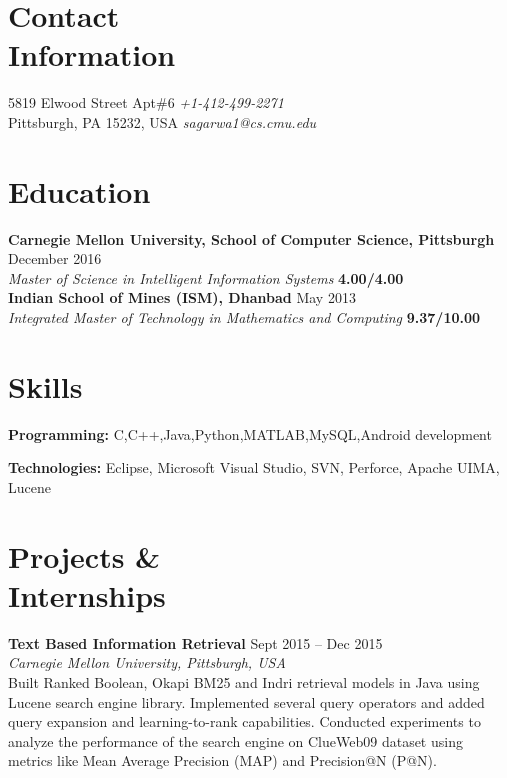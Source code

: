 \documentclass[margin,line]{resume}
\begin{document}
\begin{resume}

\section{\mysidestyle Contact \\Information}
		5819 Elwood Street Apt\#6                       \hfill \textit{+1-412-499-2271} \\
		Pittsburgh, PA 15232, USA                   \hfill \textit{sagarwa1@cs.cmu.edu}

\section{\mysidestyle Education}
		\textbf{Carnegie Mellon University, School of Computer Science, Pittsburgh} \hfill December 2016 \\
		\textit{Master of Science in Intelligent Information Systems} \hfill  \textbf{4.00/4.00} \\
		\textbf{Indian School of Mines (ISM), Dhanbad} \hfill May 2013 \\
		\textit{Integrated Master of Technology in Mathematics and Computing} \hfill \textbf{9.37/10.00}

\section{\mysidestyle Skills}
   		 	\textbf{Programming: }C,C++,Java,Python,MATLAB,MySQL,Android development

			\textbf{Technologies: }Eclipse, Microsoft Visual Studio, SVN, Perforce, Apache UIMA, Lucene

\section{\mysidestyle Projects \& \\Internships}

		\textbf{Text Based Information Retrieval} \hfill Sept 2015 -- Dec 2015 \\
  		\textit{Carnegie Mellon University, Pittsburgh, USA} \\
		Built Ranked Boolean, Okapi BM25 and Indri retrieval models in Java using Lucene search engine library. Implemented several query operators and added query expansion and learning-to-rank capabilities. 
		Conducted experiments to analyze the performance of the search engine on ClueWeb09 dataset using metrics like Mean Average Precision (MAP) and Precision@N (P@N).


\end{resume}
\end{document}
